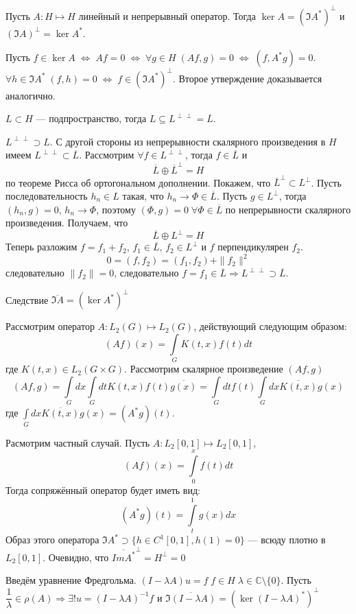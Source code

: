 \documentclass[14pt]{extarticle}
\begin{document}
\begin{Theor}[Фредгольма]
    Пусть $A : H \mapsto H$ линейный и непрерывный оператор. Тогда $\ker A = (\Im A^*)^\perp$ и $(\Im A)^\perp = \ker A^*$.
\end{Theor}
\begin{Proof}
Пусть $f \in \ker A\;\Leftrightarrow\;Af = 0\;\Leftrightarrow\;\forall g \in H\;(Af, g) = 0\;\Leftrightarrow\;(f, A^* g) = 0$.
$\forall h \in \Im A^*\;(f, h) = 0\;\Leftrightarrow\;f \in (\Im A^*)^\perp$. Второе утверждение доказывается аналогично.
\end{Proof}

\begin{Utv}
$L \subset H$ --- подпространство, тогда $L \subseteq L^{\perp\perp} = \overline{L}$.
\end{Utv}

\begin{Proof}
    $L^{\perp\perp} \supset L$.
    С другой стороны из непрерывности скалярного произведения в $H$ имеем
    $L^{\perp\perp} \subset \overline{L}$.
    Рассмотрим $\forall f \in L^{\perp\perp}$, тогда $f \in \overline{L}$ и 
    $$
    \overline{L} \oplus \overline{L}^{\perp} = H
    $$ по теореме Рисса об ортогональном дополнении.
    Покажем, что $\overline{L}^{\perp} \subset L^{\perp}$.
    Пусть последовательность $h_n \in L$ такая, что $h_n \to \Phi \in \overline{L}$.
    Пусть $g \in L^{\perp}$, тогда $(h_n, g) = 0$, $h_n \to \Phi$, поэтому $(\Phi, g) = 0\;\forall \Phi \in \overline{L}$ по непрерывности скалярного произведения.
    Получаем, что
    $$
    \overline{L} \oplus L^{\perp} = H
    $$
    Теперь разложим $f = f_1 + f_2$, $f_1 \in \overline{L}$, $f_2 \in L^{\perp}$ и $f$ перпендикулярен $f_2$.
    $$
    0 = (f, f_2) = (f_1, f_2) + \|f_2\|^2
    $$
    следовательно $\|f_2\| = 0$, следовательно $f = f_1 \in \overline{L} \Rightarrow L^{\perp\perp} \supset \overline{L}$.
\end{Proof}

\begin{MathCl}{Следствие}
    $\overline{\Im A} = (\ker A^*)^\perp$
\end{MathCl}

\begin{Prim}
	Рассмотрим оператор $A : L_2(G) \mapsto L_2(G)$, действующий следующим
	образом:
	$$
	(Af)(x) = \int \limits_G K(t, x) f(t) dt
	$$
	где $K(t, x) \in L_2(G \times G)$.
	Рассмотрим скалярное произведение $(Af, g)$
	$$
	(Af, g) = \int \limits_G dx \int \limits_G dt K(t, x) f(t) \overline{g(x)}=
	\int \limits_G dt f(t) \int \limits_G dx \overline{K(t, x)} g(x)
	$$
	где $\int \limits_G dx \overline{K(t, x)} g(x) = (A^* g)(t)$.
	
	Расмотрим частный случай.
	Пусть $A:L_2[0,1] \mapsto L_2[0,1]$,
	$$
	(A f)(x) = \int \limits_0^x f(t) dt
	$$
	Тогда сопряжённый оператор будет иметь вид:
	$$
	(A^*g)(t) = \int \limits_t^1 g(x) dx
	$$
	Образ этого оператора $\Im A^* \supset \{h\in C^1[0,1], h(1) = 0\}$ --- всюду
	плотно в $L_2[0,1]$.
	Очевидно, что $\overline{Im A^*}^\perp = H^\perp = 0$
\end{Prim}

Введём уравнение Фредгольма.
$(I - \lambda A) u = f\;f\in H\;\lambda \in \mathbb C \setminus\{0\}$.
Пусть $\dfrac{1}{\lambda} \in \rho(A) \Rightarrow \exists! u = (I - \lambda A)^{-1}f$ 
и $\overline{\Im(I - \lambda A)} = (\ker(I - \lambda A)^*)^\perp$
\end{document}
